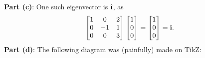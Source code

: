 \documentclass[11pt]{article}
\begin{document}
\textbf{Part (c)}: One such eigenvector is $\hat{\textbf{\i}}$, as
\[
	\begin{bmatrix} 1 & 0 & 2 \\ 0 & -1 & 1 \\ 0 & 0 & 3 \end{bmatrix} \begin{bmatrix} 1 \\ 0 \\ 0 \end{bmatrix} = \begin{bmatrix} 1 \\ 0 \\ 0 \end{bmatrix} = \hat{\textbf{\i}}.
\]
\textbf{Part (d)}: The following diagram was (painfully) made on TikZ:

\end{document}
